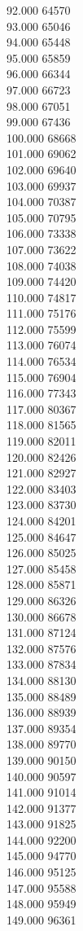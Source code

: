 { 92.000	64570 \\
 93.000	65046 \\
 94.000	65448 \\
 95.000	65859 \\
 96.000	66344 \\
 97.000	66723 \\
 98.000	67051 \\
 99.000	67436 \\
 100.000	68668 \\
 101.000	69062 \\
 102.000	69640 \\
 103.000	69937 \\
 104.000	70387 \\
 105.000	70795 \\
 106.000	73338 \\
 107.000	73622 \\
 108.000	74038 \\
 109.000	74420 \\
 110.000	74817 \\
 111.000	75176 \\
 112.000	75599 \\
 113.000	76074 \\
 114.000	76534 \\
 115.000	76904 \\
 116.000	77343 \\
 117.000	80367 \\
 118.000	81565 \\
 119.000	82011 \\
 120.000	82426 \\
 121.000	82927 \\
 122.000	83403 \\
 123.000	83730 \\
 124.000	84201 \\
 125.000	84647 \\
 126.000	85025 \\
 127.000	85458 \\
 128.000	85871 \\
 129.000	86326 \\
 130.000	86678 \\
 131.000	87124 \\
 132.000	87576 \\
 133.000	87834 \\
 134.000	88130 \\
 135.000	88489 \\
 136.000	88939 \\
 137.000	89354 \\
 138.000	89770 \\
 139.000	90150 \\
 140.000	90597 \\
 141.000	91014 \\
 142.000	91377 \\
 143.000	91825 \\
 144.000	92200 \\
 145.000	94770 \\
 146.000	95125 \\
 147.000	95588 \\
 148.000	95949 \\
 149.000	96361 \\
}
